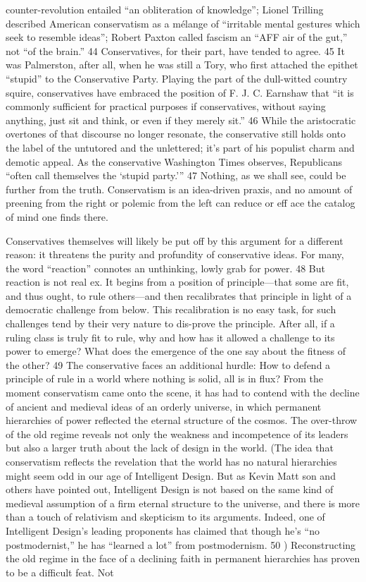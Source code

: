 counter-revolution entailed “an obliteration of knowledge”; Lionel Trilling described American conservatism as a mélange of “irritable mental gestures which seek to resemble ideas”; Robert Paxton called fascism an “AFF air of the gut,” not “of the brain.” {\color{blue} 44 } Conservatives, for their part, have tended to agree. {\color{blue} 45 } It was Palmerston, after all, when he was still a Tory, who first attached the epithet “stupid” to the Conservative Party. Playing the part of the dull-witted country squire, conservatives have embraced the position of F. J. C. Earnshaw that “it is commonly sufficient for practical purposes if conservatives, without saying anything, just sit and think, or even if they merely sit.” {\color{blue} 46 } While the aristocratic overtones of that discourse no longer resonate, the conservative still holds onto the label of the untutored and the unlettered; it’s part of his populist charm and demotic appeal. As the conservative Washington Times observes, Republicans “often call themselves the ‘stupid party.’” {\color{blue} 47 } Nothing, as we shall see, could be further from the truth. Conservatism is an idea-driven praxis, and no amount of preening from the right or polemic from the left can reduce or eff ace the catalog of mind one finds there.{\par} Conservatives themselves will likely be put off by this argument for a different reason: it threatens the purity and profundity of conservative ideas. For many, the word “reaction” connotes an unthinking, lowly grab for power. {\color{blue} 48 } But reaction is not real ex. It begins from a position of principle—that some are fit, and thus ought, to rule others—and then recalibrates that principle in light of a democratic challenge from below. This recalibration is no easy task, for such challenges tend by their very nature to dis-prove the principle. After all, if a ruling class is truly fit to rule, why and how has it allowed a challenge to its power to emerge? What does the emergence of the one say about the fitness of the other? {\color{blue} 49 } The conservative faces an additional hurdle: How to defend a principle of rule in a world where nothing is solid, all is in flux? From the moment conservatism came onto the scene, it has had to contend with the decline of ancient and medieval ideas of an orderly universe, in which permanent hierarchies of power reflected the eternal structure of the cosmos. The over-throw of the old regime reveals not only the weakness and incompetence of its leaders but also a larger truth about the lack of design in the world. (The idea that conservatism reflects the revelation that the world has no natural hierarchies might seem odd in our age of Intelligent Design. But as Kevin Matt son and others have pointed out, Intelligent Design is not based on the same kind of medieval assumption of a firm eternal structure to the universe, and there is more than a touch of relativism and skepticism to its arguments. Indeed, one of Intelligent Design’s leading proponents has claimed that though he’s “no postmodernist,” he has “learned a lot” from postmodernism. {\color{blue} 50 }) Reconstructing the old regime in the face of a declining faith in permanent hierarchies has proven to be a difficult feat. Not 